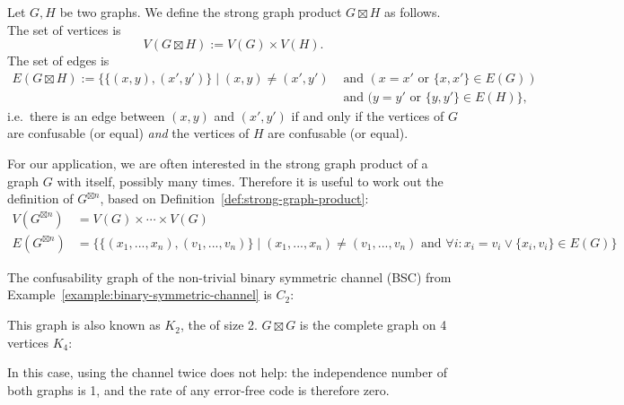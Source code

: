 \begin{definition}\label{def:strong-graph-product}
Let $G, H$ be two graphs. We define the strong graph product $G \boxtimes H$ as follows. The set of vertices is
\[
V(G \boxtimes H) := V(G) \times V(H).
\]
The set of edges is
\[
\begin{split}
E(G \boxtimes H) := \big\{\{(x,y),(x',y')\} \mid (x,y) \neq (x',y') &\mbox{ and }  (x = x' \mbox{ or } \{x,x'\} \in E(G))\\ 
&\mbox{ and } (y=y' \mbox{ or } \{y,y'\} \in E(H) \big\},
\end{split}
\]
i.e.\ there is an edge between $(x,y)$ and $(x',y')$ if and only if the vertices of $G$ are confusable (or equal) \emph{and} the vertices of $H$ are confusable (or equal).
\end{definition}
For our application, we are often interested in the strong graph product of a graph $G$ with itself, possibly many times. Therefore it is useful to work out the definition of $G^{\boxtimes n}$, based on Definition~\ref{def:strong-graph-product}:
\begin{align*}
V(G^{\boxtimes n}) &= V(G) \times \cdots \times V(G)\\
E(G^{\boxtimes n}) &= \big\{ \{(x_1, ..., x_n),(v_1, ..., v_n)\}  \mid (x_1, ..., x_n) \neq (v_1, ..., v_n) \mbox{ and } \forall i : x_i = v_i \vee \{x_i,v_i\} \in E(G)\}
\end{align*}



\begin{example}\label{example:bsc-graph}
The confusability graph of the non-trivial binary symmetric channel (BSC) from Example~\ref{example:binary-symmetric-channel} is $C_2$:
\begin{center}
\end{center}
This graph is also known as $K_2$, the  of size 2. $G \boxtimes G$ is the complete graph on 4 vertices $K_4$:
\begin{center}
\end{center}
In this case, using the channel twice does not help: the independence number of both graphs is 1, and the rate of any error-free code is therefore zero.
\end{example}


